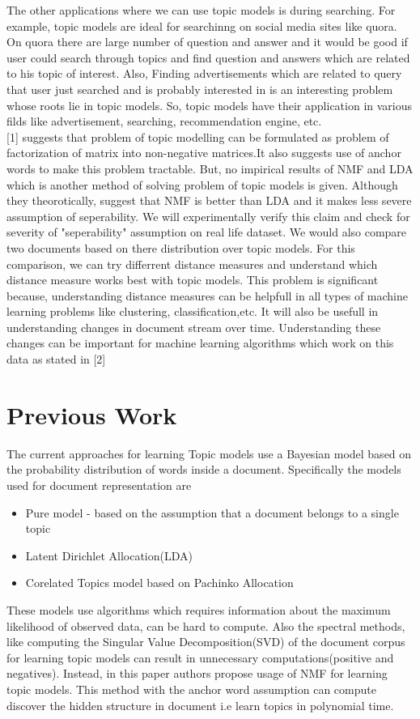 \documentclass[a4paper,11pt]{article}
\begin{document}
{The other applications where we can use topic models is during searching. For example, topic models are ideal for searchinng on social media sites like quora. On quora there are large number of question and answer and it would be good if user could search through topics and find question and answers which are related to his topic of interest. Also, Finding advertisements which are related to query that user just searched and is probably interested in is an interesting problem whose roots lie in topic models. So, topic models have their application in various filds like advertisement, searching, recommendation engine, etc. \\

[1] suggests that problem of topic modelling can be formulated as problem of factorization of matrix into non-negative matrices.It also suggests use of anchor words to make this problem tractable. But, no impirical results of NMF and LDA which is another method of solving problem of topic models is given. Although they theorotically, suggest that NMF is better than LDA and it makes less severe assumption of seperability. We will experimentally verify this claim and check for severity of "seperability" assumption on real life dataset. We would also compare two documents based on there distribution over topic models. For this comparison, we can try differrent distance measures and understand which distance measure works best with topic models. This problem is significant because, understanding distance measures can be helpfull in all types of machine learning problems like clustering, classification,etc. It will also be usefull in understanding changes in document stream over time. Understanding these changes can be important for machine learning algorithms which work on this data as stated in [2]

\section{Previous Work}

The current approaches for learning Topic models use a Bayesian model based on the probability distribution of words inside a document. Specifically the models used for document representation are

\begin{itemize} 
\item Pure model - based on the assumption that a document belongs to a single topic
\item Latent Dirichlet Allocation(LDA)
\item Corelated Topics model based on Pachinko Allocation
\end{itemize}
These models use algorithms which requires information about the maximum likelihood of observed data, can be hard to compute. Also the spectral methods, like computing the Singular Value Decomposition(SVD) of the document corpus for learning topic models can result in unnecessary computations(positive and negatives). Instead, in this paper authors propose usage of NMF for learning topic models. This method with the anchor word assumption can compute discover the hidden structure in document i.e learn topics in polynomial time. 


}
\end{document}
